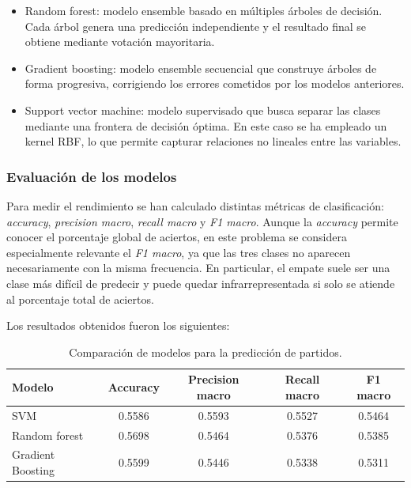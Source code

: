 \begin{itemize}
    \item {Random forest}: modelo ensemble basado en múltiples árboles de
    decisión. Cada árbol genera una predicción independiente y el resultado final se
    obtiene mediante votación mayoritaria.

    \item {Gradient boosting}: modelo ensemble secuencial que construye árboles de forma progresiva, corrigiendo los errores cometidos por los modelos anteriores.

    \item {Support vector machine}: modelo supervisado que busca separar las clases mediante una frontera de decisión óptima. En este caso se ha empleado un kernel RBF, lo que permite capturar relaciones no lineales entre las variables.
\end{itemize}

\subsubsection{Evaluación de los modelos}

Para medir el rendimiento se han calculado distintas métricas de clasificación: \textit{accuracy}, \textit{precision macro}, \textit{recall macro} y \textit{F1 macro}. Aunque la \textit{accuracy} permite conocer el porcentaje global de aciertos, en este problema se considera especialmente relevante el \textit{F1 macro}, ya que las tres clases no aparecen necesariamente con la misma frecuencia. En particular, el empate suele ser una clase más difícil de predecir y puede quedar infrarrepresentada si solo se atiende al porcentaje total de aciertos.

Los resultados obtenidos fueron los siguientes:

\begin{table}[H]
\centering
\caption{Comparación de modelos para la predicción de partidos.}
\label{tab:evaluacion_prediccon}
\begin{tabular}{|l|c|c|c|c|}
\hline
\textbf{Modelo} & \textbf{Accuracy} & \textbf{Precision macro} & \textbf{Recall macro} & \textbf{F1 macro} \\
\hline
SVM & 0.5586 & 0.5593 & 0.5527 & 0.5464 \\
\hline
Random forest & 0.5698 & 0.5464 & 0.5376 & 0.5385 \\
\hline
Gradient Boosting & 0.5599 & 0.5446 & 0.5338 & 0.5311 \\
\hline
\end{tabular}
\end{table}

